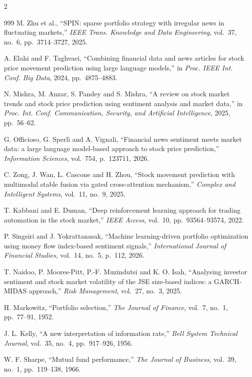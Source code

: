 \begin{footnotesize}
\begin{multicols}{2}
\begin{thebibliography}{999}
 M. Zhu et al., ``SPIN: sparse portfolio strategy with irregular news in
fluctuating markets,'' \emph{IEEE Trans. Knowledge and Data Engineering}, vol.~37, no.~6,
pp.~3714--3727, 2025.

 A. Elahi and F. Taghvaei, ``Combining financial data and news articles for
stock price movement prediction using large language models,'' in \emph{Proc. IEEE Int. Conf.
Big Data}, 2024, pp.~4875--4883.

 N. Mishra, M. Anzar, S. Pandey and S. Mishra, ``A review on stock market
trends and stock price prediction using sentiment analysis and market data,'' in \emph{Proc.
Int. Conf. Communication, Security, and Artificial Intelligence}, 2025, pp.~56--62.

 G. Officioso, G. Sperl\`i and A. Vignali, ``Financial news sentiment
meets market data: a large language model-based approach to stock price prediction,''
\emph{Information Sciences}, vol.~754, p.~123711, 2026.

 C. Zong, J. Wan, L. Cascone and H. Zhou, ``Stock movement prediction with
multimodal stable fusion via gated cross-attention mechanism,'' \emph{Complex and Intelligent
Systems}, vol.~11, no.~9, 2025.

 T. Kabbani and E. Duman, ``Deep reinforcement learning approach for
trading automation in the stock market,'' \emph{IEEE Access}, vol.~10, pp.~93564--93574,
2022.

 P. Singsiri and J. Yokrattanasak, ``Machine learning-driven portfolio
optimization using money flow index-based sentiment signals,'' \emph{International Journal of
Financial Studies}, vol.~14, no.~5, p.~112, 2026.

 T. Naidoo, P. Moores-Pitt, P.-F. Muzindutsi and K. O. Isah, ``Analysing
investor sentiment and stock market volatility of the JSE size-based indices: a GARCH-MIDAS
approach,'' \emph{Risk Management}, vol.~27, no.~3, 2025.

 H. Markowitz, ``Portfolio selection,'' \emph{The Journal of Finance},
vol.~7, no.~1, pp.~77--91, 1952.

 J. L. Kelly, ``A new interpretation of information rate,'' \emph{Bell
System Technical Journal}, vol.~35, no.~4, pp.~917--926, 1956.

 W. F. Sharpe, ``Mutual fund performance,'' \emph{The Journal of
Business}, vol.~39, no.~1, pp.~119--138, 1966.


\end{thebibliography}
\end{multicols}
\end{footnotesize}

